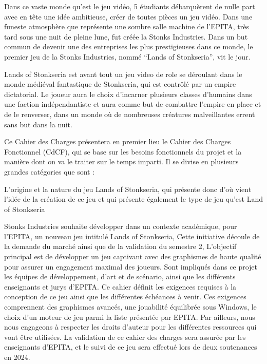 Dans ce vaste monde qu’est le jeu vidéo, 5 étudiants débarquèrent de nulle part avec en tête une idée ambitieuse, créer de toutes pièces un jeu vidéo. Dans une funeste atmosphère que représente une sombre salle machine de l’EPITA, très tard sous une nuit de pleine lune, fut créée la Stonks Industries. Dans un but commun de devenir une des entreprises les plus prestigieuses dans ce monde, le premier jeu de la Stonks Industries, nommé “Lands of Stonkseria”, vit le jour.

Lands of Stonkseria est avant tout un jeu video de role se déroulant dans le monde médiéval fantastique de Stonkseria, qui est contrôlé par un empire dictatorial. Le joueur aura le choix d’incarner plusieurs classes d’humains dans une faction indépendantiste et aura comme but de combattre l’empire en place et de le renverser, dans un monde où de nombreuses créatures malveillantes errent sans but dans la nuit.

Ce Cahier des Charges présentera en premier lieu le Cahier des Charges Fonctionnel (CdCF), qui se base sur les besoins fonctionnels du projet et la manière dont on va le traiter sur le temps imparti. Il se divise en plusieurs grandes catégories que sont :

L’origine et la nature du jeu Lands of Stonkseria, qui présente donc d'où vient l'idée de la création de ce jeu et qui présente également le type de jeu qu’est Land of Stonkseria


Stonks Industries souhaite développer dans un contexte académique, pour l’EPITA, un nouveau jeu intitulé Lands of Stonkseria, Cette initiative découle de la demande du marché ainsi que de la validation du semestre 2,
    L’objectif principal est de développer un jeu captivant avec des graphismes de haute qualité pour assurer un engagement maximal des joueurs.
    Sont impliqués dans ce projet les équipes de développement, d’art et de scénario, ainsi que les différents enseignants et jurys d’EPITA.
    Ce cahier définit les exigences requises à la conception de ce jeu ainsi que les différentes échéances à venir. Ces exigences comprennent des graphismes avancés, une jouabilité équilibrée sous Windows, le choix d’un moteur de jeu parmi la liste présentée par EPITA. Par ailleurs, nous nous engageons à respecter les droits d’auteur pour les différentes ressources qui vont être utilisées.
    La validation de ce cahier des charges sera assurée par les enseignants d’EPITA, et le suivi de ce jeu sera effectué lors de deux soutenances en 2024.